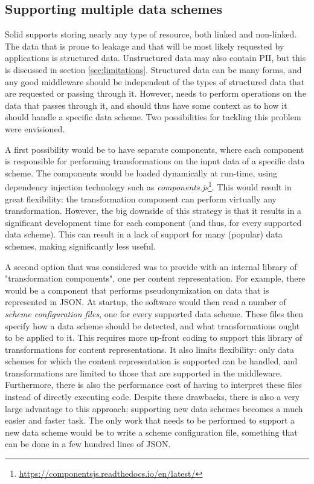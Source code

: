 \subsection{Supporting multiple data schemes}
Solid supports storing nearly any type of resource, both linked and non-linked. The data that is prone to leakage and that will be most likely requested by applications is structured data. Unstructured data may also contain \gls{PII}, but this is discussed in section \ref{sec:limitations}. Structured data can be many forms, and any good middleware should be independent of the types of structured data that are requested or passing through it. However, \middleware{} needs to perform operations on the data that passes through it, and should thus have some context as to how it should handle a specific data scheme. Two possibilities for tackling this problem were envisioned.

A first possibility would be to have separate components, where each component is responsible for performing transformations on the input data of a specific data scheme. The components would be loaded dynamically at run-time, using dependency injection technology such as \textit{components.js}\footnote{\url{https://componentsjs.readthedocs.io/en/latest/}}. This would result in great flexibility: the transformation component can perform virtually any transformation. However, the big downside of this strategy is that it results in a significant development time for each component (and thus, for every supported data scheme). This can result in a lack of support for many (popular) data schemes, making \middleware{} significantly less useful. 

A second option that was considered was to provide \middleware{} with an internal library of "transformation components", one per content representation. For example, there would be a component that performs pseudonymization on data that is represented in JSON. At startup, the software would then read a number of \textit{scheme configuration files}, one for every supported data scheme. These files then specify how a data scheme should be detected, and what transformations ought to be applied to it. This requires more up-front coding to support this library of transformations for content representations. It also limits flexibility: only data schemes for which the content representation is supported can be handled, and transformations are limited to those that are supported in the middleware. Furthermore, there is also the performance cost of having to interpret these files instead of directly executing code. Despite these drawbacks, there is also a very large advantage to this approach: supporting new data schemes becomes a much easier and faster task. The only work that needs to be performed to support a new data scheme would be to write a scheme configuration file, something that can be done in a few hundred lines of JSON.

